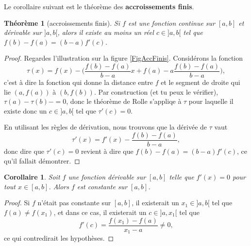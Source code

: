 \documentclass[a4paper,12pt]{book}
\newcounter{numtho}
\theoremstyle{mes_exemples}	\newtheorem{exemple}[numtho]{Exemple}
\theoremstyle{mes_tho}
\newtheorem{corollary}[numtho]{Corollaire}
\newtheorem{theorem}[numtho]{Théorème}
\newcommand{\defe}[2]{\textbf{#1}\index{#2}}
\begin{document}
Le corollaire suivant est le théorème des \defe{accroissements finis}{Théorème!accroissement fini}.

\begin{theorem}[accroissements finis]		\label{ThoAccFinis}
	Si $f$ est une fonction continue sur $[a,b]$ et dérivable sur $]a,b[$, alors il existe au moins un réel $c\in]a,b[$ tel que $f(b)-f(a)=(b-a)f'(c)$.
\end{theorem}

\newcommand{\CaptionAccfinis}{Illustration du théorème des accroissements finis. Nous avons effectivement qu'au point $c$, la tangente est parallèle au segment qui joint $a$ et $b$.}


\begin{proof}
	Regardes l'illustration sur la figure \ref{FigAccFinis}. Considérons la fonction
	\begin{equation}
		\tau(x)=f(x)-\big( \frac{ f(b)-f(a) }{ b-a }x + f(a) - a\frac{ f(b)-f(a) }{ b-a } \big),
	\end{equation}
	c'est à dire la fonction qui donne la distance entre $f$ et le segment de droite qui lie $(a,f(a))$ à $(b,f(b))$. Par construction (et tu peux le vérifier), $\tau(a)-\tau(b)-=0$, donc le théorème de Rolle s'appliqe à $\tau$ pour laquelle il existe donc un $c\in]a,b[$ tel que $\tau'(c)=0$.

	En utilisant les règles de dérivation, nous trouvons que la dérivée de $\tau$ vaut
	\begin{equation}
		\tau'(x)= f'(x)-\frac{ f(b)-f(a) }{ b-a },
	\end{equation}
	donc dire que $\tau'(c)=0$ revient à dire que $f(b)-f(a)=(b-a)f'(c)$, ce qu'il fallait démontrer.
\end{proof}

\begin{corollary}
Soit $f$ une fonction dérivable sur $[a,b]$ telle que $f'(x) = 0$ pour tout $x \in [a,b]$. Alors $f$ est constante sur $[a,b]$.
\end{corollary}

\begin{proof}
	Si $f$ n'était pas constante sur $[a,b]$, il existerait un $x_1\in ]a,b[$ tel que $f(a)\neq f(x_1)$, et dans ce cas, il existerait un $c\in]a,x_1[$ tel que 
	\begin{equation}
		f'(c)=\frac{ f(x_1)-f(a) }{ x_1-a }\neq 0,
	\end{equation}
	ce qui contredirait les hypothèses.
\end{proof}
\end{document}
